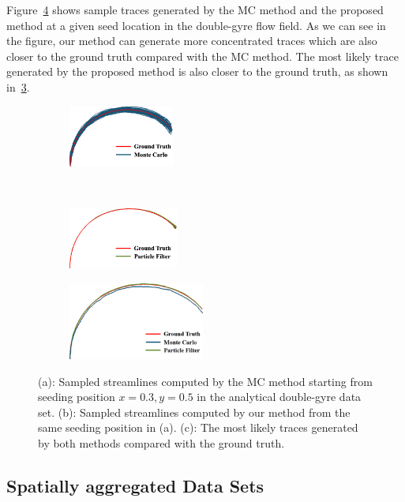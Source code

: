 Figure~\ref{case_1} shows sample traces generated by the MC method and the proposed method at a given seed location in the double-gyre flow field. As we can see in the figure, our method can generate more concentrated traces which are also closer to the ground truth compared with the MC method. The most likely trace generated by the proposed method is also closer to the ground truth, as shown in~\ref{case_1_c}.

\begin{figure}[!htb]
  \centering
  \begin{subfigure}[!htb]{0.25\textwidth}
    \centering
    \includegraphics[height=0.8in]{../figures/double_gyre_mc35.eps}
    \caption{}
    \label{case_1_a}
  \end{subfigure}~
  \begin{subfigure}[!htb]{0.25\textwidth}
    \centering
    \includegraphics[height=0.8in]{../figures/double_gyre_smc35.eps}
    \caption{}
    \label{case_1_b}
  \end{subfigure}

  \begin{subfigure}[!htb]{0.5\textwidth}
    \centering
    \includegraphics[height=1.0in]{../figures/double_gyre_opt35.eps}
    \caption{}
    \label{case_1_c}
  \end{subfigure}
  \caption{(a): Sampled streamlines computed by the MC method starting from seeding position $x=0.3, y=0.5$ in the analytical double-gyre data set. (b): Sampled streamlines computed by our method from the same seeding position in (a). (c): The most likely traces generated by both methods compared with the ground truth.}
  \label{case_1}
\end{figure}

\subsection{Spatially aggregated Data Sets}

